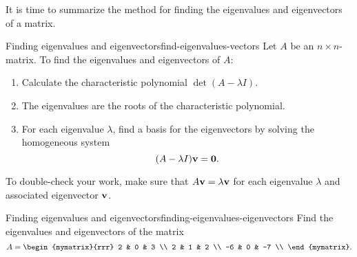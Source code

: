 It is time to summarize the method for finding the eigenvalues and
eigenvectors of a matrix.

\begin{procedure}{Finding eigenvalues and eigenvectors}{find-eigenvalues-vectors}
  Let $A$ be an $n\times n$-matrix. To find the eigenvalues and
  eigenvectors of $A$:
  \begin{enumerate}
  \item Calculate the characteristic polynomial $\det(A-\lambda I)$.
  \item The eigenvalues are the roots of the characteristic polynomial.
  \item For each eigenvalue $\lambda$, find a basis for the
    eigenvectors by solving the homogeneous system
    \begin{equation*}
      (A-\lambda I)\mbox{\bf v} = \mbox{\bf 0}.
    \end{equation*}
  \end{enumerate}
  To double-check your work, make sure that $A\mbox{\bf v}=\lambda\mbox{\bf v}$
  for each eigenvalue $\lambda$ and associated eigenvector $\mbox{\bf v}$.
\end{procedure}

\begin{example}{Finding eigenvalues and eigenvectors}{finding-eigenvalues-eigenvectors}
  Find the eigenvalues and eigenvectors of the matrix
  \begin{equation}
    A = \begin{mymatrix}{rrr}
      2  & 0 & 3 \\
      2  & 1 & 2 \\
      -6 & 0 & -7 \\
    \end{mymatrix}.
  \end{equation}
\end{example}

